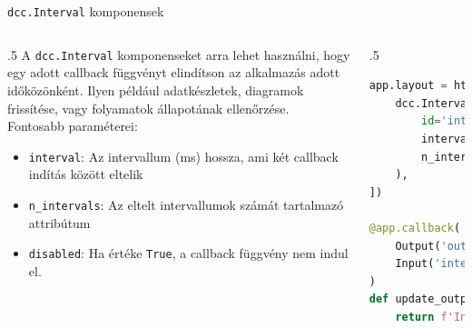 \documentclass[english, aspectratio=169]{beamer}
\begin{document}
\begin{frame}[fragile]{\texttt{dcc.Interval} komponensek}
	\begin{columns}
		\begin{column}{.5\textwidth}
			A \texttt{dcc.Interval} komponenseket arra lehet használni, hogy egy adott callback függvényt elindítson az alkalmazás adott időközönként. Ilyen például adatkészletek, diagramok frissítése, vagy folyamatok állapotának ellenőrzése. Fontosabb paraméterei:
			\begin{itemize}
				\item \texttt{interval}: Az intervallum (ms) hossza, ami két callback indítás között eltelik
				\item \texttt{n\_intervals}: Az eltelt intervallumok számát tartalmazó attribútum
				\item \texttt{disabled}: Ha értéke \texttt{True}, a callback függvény nem indul el.
			\end{itemize}
		\end{column}
		\begin{column}{.5\textwidth}
			\begin{lstlisting}[language=python]
app.layout = html.Div([
	dcc.Interval(
		id='interval-component', 
		interval=1 * 1000,
		n_intervals=0,
	),
])

@app.callback(
	Output('output', 'children'),
	Input('interval-component', 'n_intervals')
)
def update_output(n):
	return f'Interval has triggered {n} times.'				
			\end{lstlisting}
		\end{column}
	\end{columns}
\end{frame}
\end{document}
